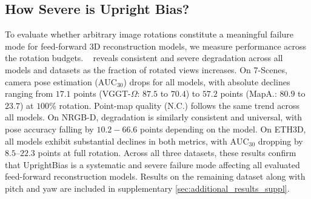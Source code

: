 \vspace{-2mm}
\subsection{How Severe is Upright Bias?}
\label{sec:how_severe_is_upright_bias}



To evaluate whether arbitrary image rotations constitute a meaningful failure mode for feed-forward 3D reconstruction models, we measure performance across the rotation budgets. ~ reveals consistent and severe degradation across all models and datasets as the fraction of rotated views increases. On 7-Scenes, camera pose estimation ($\mathrm{AUC}_{30}$) drops for all models, with absolute declines ranging from $17.1$ points (VGGT-$\Omega$: $87.5$ to $70.4$) to $57.2$ points (MapA.: $80.9$ to $23.7$) at $100\%$ rotation. Point-map quality (N.C.) follows the same trend across all models. On NRGB-D, degradation is similarly consistent and universal, with pose accuracy falling by $10.2-66.6$ points depending on the model. On ETH3D, all models exhibit substantial declines in both metrics, with $\mathrm{AUC}_{30}$ dropping by $8.5$--$22.3$ points at full rotation. Across all three datasets, these results confirm that UprightBias is a systematic and severe failure mode affecting all evaluated feed-forward reconstruction models. Results on the remaining dataset along with pitch and yaw are included in supplementary \cref{sec:additional_results_suppl}.





